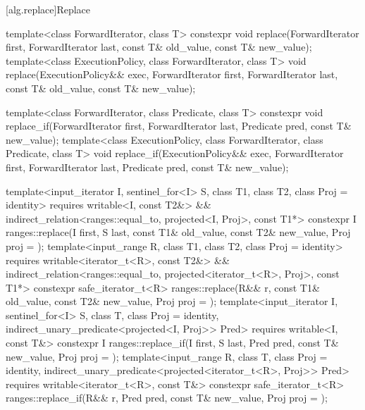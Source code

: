 [alg.replace]{Replace}

%
%
\begin{itemdecl}
template<class ForwardIterator, class T>
  constexpr void replace(ForwardIterator first, ForwardIterator last,
                         const T& old_value, const T& new_value);
template<class ExecutionPolicy, class ForwardIterator, class T>
  void replace(ExecutionPolicy&& exec,
               ForwardIterator first, ForwardIterator last,
               const T& old_value, const T& new_value);

template<class ForwardIterator, class Predicate, class T>
  constexpr void replace_if(ForwardIterator first, ForwardIterator last,
                            Predicate pred, const T& new_value);
template<class ExecutionPolicy, class ForwardIterator, class Predicate, class T>
  void replace_if(ExecutionPolicy&& exec,
                  ForwardIterator first, ForwardIterator last,
                  Predicate pred, const T& new_value);

template<input_iterator I, sentinel_for<I> S, class T1, class T2, class Proj = identity>
  requires writable<I, const T2&> &&
           indirect_relation<ranges::equal_to, projected<I, Proj>, const T1*>
  constexpr I
    ranges::replace(I first, S last, const T1& old_value, const T2& new_value, Proj proj = {});
template<input_range R, class T1, class T2, class Proj = identity>
  requires writable<iterator_t<R>, const T2&> &&
           indirect_relation<ranges::equal_to, projected<iterator_t<R>, Proj>, const T1*>
  constexpr safe_iterator_t<R>
    ranges::replace(R&& r, const T1& old_value, const T2& new_value, Proj proj = {});
template<input_iterator I, sentinel_for<I> S, class T, class Proj = identity,
         indirect_unary_predicate<projected<I, Proj>> Pred>
  requires writable<I, const T&>
  constexpr I ranges::replace_if(I first, S last, Pred pred, const T& new_value, Proj proj = {});
template<input_range R, class T, class Proj = identity,
         indirect_unary_predicate<projected<iterator_t<R>, Proj>> Pred>
  requires writable<iterator_t<R>, const T&>
  constexpr safe_iterator_t<R>
    ranges::replace_if(R&& r, Pred pred, const T& new_value, Proj proj = {});
\end{itemdecl}

